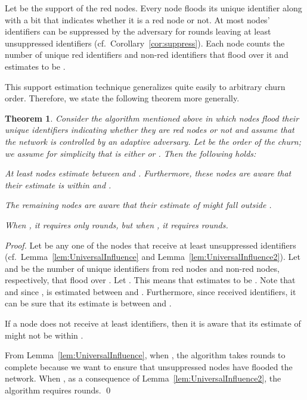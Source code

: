 \documentclass[leqno,11pt]{article}
\newtheorem{theorem}{Theorem}[section]
\begin{document}
{Let  be the
support of the red nodes. Every node floods its unique identifier along with a
bit that indicates whether it is a red node or not.  At most 
nodes' identifiers can be suppressed by the adversary for  rounds leaving  at least  unsuppressed identifiers (cf.\ Corollary~\ref{cor:suppress}). Each node
counts the number of unique red identifiers  and non-red identifiers  that
flood over it and estimates  to be .  

This support
estimation technique generalizes quite easily to arbitrary churn order.
Therefore, we state the following theorem more generally.
\begin{theorem}\label{thm:AdaptiveSupport}
Consider the algorithm mentioned above in which nodes flood their unique
identifiers indicating whether they are red nodes or not and assume that the
network is controlled by an adaptive adversary.  Let  be the
order of the churn; we assume for simplicity that  is either  or
.  Then the following holds:
\begin{compactenum}
	\item At least   nodes estimate   between  and . Furthermore, these nodes are aware that their estimate is within  and .
	\item The remaining nodes are aware that their estimate of  might fall
    outside .
	\end{compactenum}
	When , it requires only  rounds, but when , it requires  rounds.
\end{theorem}

\begin{proof}
Let  be any one of the  nodes that receive at least  unsuppressed identifiers (cf.\ Lemma~\ref{lem:UniversalInfluence} and
Lemma~\ref{lem:UniversalInfluence2}). Let  and  be the number of unique
identifiers from red nodes and non-red nodes, respectively, that flood over .
Let . This means that  estimates  to be
. Note that  and since , 
is estimated between  and .
Furthermore, since  received  identifiers, it can be sure
that its estimate is between  and .

If a node does not receive at least  identifiers, then it is
aware that its estimate of  might not be within .

From Lemma~\ref{lem:UniversalInfluence}, when ,  the algorithm takes  rounds to complete because we want to ensure that unsuppressed nodes have flooded the network. When , as a consequence of Lemma~\ref{lem:UniversalInfluence2}, the algorithm requires  rounds. 
\qed
\end{proof}

}
\end{document}
